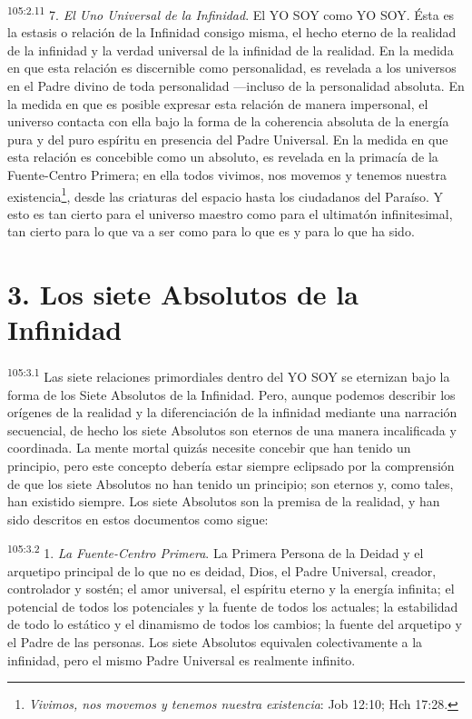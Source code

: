 \par
\textsuperscript{105:2.11} 7. \textit{El Uno Universal de la Infinidad}. El YO SOY como YO SOY. Ésta es la estasis o relación de la Infinidad consigo misma, el hecho eterno de la realidad de la infinidad y la verdad universal de la infinidad de la realidad. En la medida en que esta relación es discernible como personalidad, es revelada a los universos en el Padre divino de toda personalidad ---incluso de la personalidad absoluta. En la medida en que es posible expresar esta relación de manera impersonal, el universo contacta con ella bajo la forma de la coherencia absoluta de la energía pura y del puro espíritu en presencia del Padre Universal. En la medida en que esta relación es concebible como un absoluto, es revelada en la primacía de la Fuente-Centro Primera; en ella todos vivimos, nos movemos y tenemos nuestra existencia\footnote{\textit{Vivimos, nos movemos y tenemos nuestra existencia}: Job 12:10; Hch 17:28.}, desde las criaturas del espacio hasta los ciudadanos del Paraíso. Y esto es tan cierto para el universo maestro como para el ultimatón infinitesimal, tan cierto para lo que va a ser como para lo que es y para lo que ha sido.

\section*{3. Los siete Absolutos de la Infinidad}
\par
\textsuperscript{105:3.1} Las siete relaciones primordiales dentro del YO SOY se eternizan bajo la forma de los Siete Absolutos de la Infinidad. Pero, aunque podemos describir los orígenes de la realidad y la diferenciación de la infinidad mediante una narración secuencial, de hecho los siete Absolutos son eternos de una manera incalificada y coordinada. La mente mortal quizás necesite concebir que han tenido un principio, pero este concepto debería estar siempre eclipsado por la comprensión de que los siete Absolutos no han tenido un principio; son eternos y, como tales, han existido siempre. Los siete Absolutos son la premisa de la realidad, y han sido descritos en estos documentos como sigue:

\par
\textsuperscript{105:3.2} 1. \textit{La Fuente-Centro Primera}. La Primera Persona de la Deidad y el arquetipo principal de lo que no es deidad, Dios, el Padre Universal, creador, controlador y sostén; el amor universal, el espíritu eterno y la energía infinita; el potencial de todos los potenciales y la fuente de todos los actuales; la estabilidad de todo lo estático y el dinamismo de todos los cambios; la fuente del arquetipo y el Padre de las personas. Los siete Absolutos equivalen colectivamente a la infinidad, pero el mismo Padre Universal es realmente infinito.

